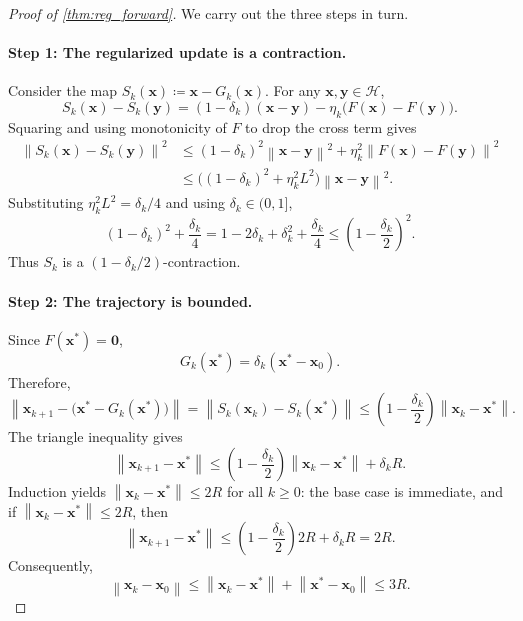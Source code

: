 \documentclass[10pt,a4paper]{amsart}
\newcommand{\norm}[1]{\left\| #1 \right\|}
\newcommand{\vect}[1]{\mathbf{#1}}
\begin{document}
\begin{proof}[Proof of \cref{thm:reg_forward}]
We carry out the three steps in turn.

\paragraph{Step 1: The regularized update is a contraction.}
Consider the map \(S_k(\vect{x})\coloneqq\vect{x}-G_k(\vect{x})\). For any
\(\vect{x},\vect{y}\in\mathcal H\),
\[
    S_k(\vect{x})-S_k(\vect{y})
    =
    (1-\delta_k)(\vect{x}-\vect{y})
    -\eta_k\bigl(F(\vect{x})-F(\vect{y})\bigr).
\]
Squaring and using monotonicity of \(F\) to drop the cross term gives
\begin{align*}
    \norm{S_k(\vect{x})-S_k(\vect{y})}^2
    &\le
    (1-\delta_k)^2\norm{\vect{x}-\vect{y}}^2
    +\eta_k^2\norm{F(\vect{x})-F(\vect{y})}^2 \\
    &\le
    \bigl((1-\delta_k)^2+\eta_k^2L^2\bigr)
    \norm{\vect{x}-\vect{y}}^2.
\end{align*}
Substituting \(\eta_k^2L^2=\delta_k/4\) and using
\(\delta_k\in(0,1]\),
\[
    (1-\delta_k)^2+\frac{\delta_k}{4}
    =
    1-2\delta_k+\delta_k^2+\frac{\delta_k}{4}
    \le
    \left(1-\frac{\delta_k}{2}\right)^2.
\]
Thus \(S_k\) is a \((1-\delta_k/2)\)-contraction.

\paragraph{Step 2: The trajectory is bounded.}
Since \(F(\vect{x}^*)=\vect{0}\),
\[
    G_k(\vect{x}^*)=\delta_k(\vect{x}^*-\vect{x}_0).
\]
Therefore,
\[
    \norm{\vect{x}_{k+1}-\bigl(\vect{x}^*-G_k(\vect{x}^*)\bigr)}
    =
    \norm{S_k(\vect{x}_k)-S_k(\vect{x}^*)}
    \le
    \left(1-\frac{\delta_k}{2}\right)\norm{\vect{x}_k-\vect{x}^*}.
\]
The triangle inequality gives
\[
    \norm{\vect{x}_{k+1}-\vect{x}^*}
    \le
    \left(1-\frac{\delta_k}{2}\right)\norm{\vect{x}_k-\vect{x}^*}
    +\delta_k R.
\]
Induction yields \(\norm{\vect{x}_k-\vect{x}^*}\le2R\) for all \(k\ge0\): the
base case is immediate, and if \(\norm{\vect{x}_k-\vect{x}^*}\le2R\), then
\[
    \norm{\vect{x}_{k+1}-\vect{x}^*}
    \le
    \left(1-\frac{\delta_k}{2}\right)2R+\delta_kR
    =
    2R.
\]
Consequently,
\[
    \norm{\vect{x}_k-\vect{x}_0}
    \le
    \norm{\vect{x}_k-\vect{x}^*}+\norm{\vect{x}^*-\vect{x}_0}
    \le
    3R.
\]


\end{proof}
\end{document}
